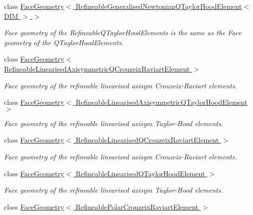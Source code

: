 \begin{DoxyCompactItemize}
class \hyperlink{classoomph_1_1FaceGeometry_3_01RefineableGeneralisedNewtonianQTaylorHoodElement_3_01DIM_01_4_01_4}{Face\+Geometry$<$ Refineable\+Generalised\+Newtonian\+Q\+Taylor\+Hood\+Element$<$ D\+I\+M $>$ $>$}
\begin{DoxyCompactList}\small\item\em Face geometry of the Refineable\+Q\+Taylor\+Hood\+Elements is the same as the Face geometry of the Q\+Taylor\+Hood\+Elements. \end{DoxyCompactList}\item 
class \hyperlink{classoomph_1_1FaceGeometry_3_01RefineableLinearisedAxisymmetricQCrouzeixRaviartElement_01_4}{Face\+Geometry$<$ Refineable\+Linearised\+Axisymmetric\+Q\+Crouzeix\+Raviart\+Element $>$}
\begin{DoxyCompactList}\small\item\em Face geometry of the refineable linearised axisym Crouzeix-\/\+Raviart elements. \end{DoxyCompactList}\item 
class \hyperlink{classoomph_1_1FaceGeometry_3_01RefineableLinearisedAxisymmetricQTaylorHoodElement_01_4}{Face\+Geometry$<$ Refineable\+Linearised\+Axisymmetric\+Q\+Taylor\+Hood\+Element $>$}
\begin{DoxyCompactList}\small\item\em Face geometry of the refineable linearised axisym Taylor-\/\+Hood elements. \end{DoxyCompactList}\item 
class \hyperlink{classoomph_1_1FaceGeometry_3_01RefineableLinearisedQCrouzeixRaviartElement_01_4}{Face\+Geometry$<$ Refineable\+Linearised\+Q\+Crouzeix\+Raviart\+Element $>$}
\begin{DoxyCompactList}\small\item\em Face geometry of the refineable linearised axisym Crouzeix-\/\+Raviart elements. \end{DoxyCompactList}\item 
class \hyperlink{classoomph_1_1FaceGeometry_3_01RefineableLinearisedQTaylorHoodElement_01_4}{Face\+Geometry$<$ Refineable\+Linearised\+Q\+Taylor\+Hood\+Element $>$}
\begin{DoxyCompactList}\small\item\em Face geometry of the refineable linearised axisym Taylor-\/\+Hood elements. \end{DoxyCompactList}\item 
class \hyperlink{classoomph_1_1FaceGeometry_3_01RefineablePolarCrouzeixRaviartElement_01_4}{Face\+Geometry$<$ Refineable\+Polar\+Crouzeix\+Raviart\+Element $>$}

\end{DoxyCompactItemize}
